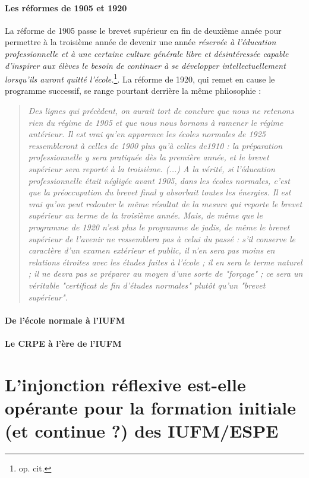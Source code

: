 \documentclass[a4paper,11pt]{article}
\begin{document}
			\subsection{Les réformes de 1905 et 1920}
			La réforme de 1905 passe le brevet supérieur en fin de deuxième année pour permettre à la troisième année de devenir une année \emph{réservée à l'éducation professionnelle et à une certaine culture générale libre et désintéressée capable d'inspirer aux élèves le besoin de continuer à se développer intellectuellement lorsqu'ils auront quitté l'école.}\footnote{op. cit.}. La réforme de 1920, qui remet en cause le programme successif, se range pourtant derrière la même philosophie : 
			\begin{quote}
			\emph{Des lignes qui précèdent, on aurait tort de conclure que nous ne retenons rien du régime de 1905 et que nous nous bornons à ramener le régime antérieur. Il est vrai qu'en apparence les écoles normales de 1925 ressembleront à celles de 1900 plus qu'à celles de1910 : la préparation professionnelle y sera pratiquée dès la première année, et le brevet supérieur sera reporté à la troisième. (...) A la vérité, si l'éducation professionnelle était négligée avant 1905, dans les écoles normales, c'est que la préoccupation du brevet final y absorbait toutes les énergies. Il est vrai qu'on peut redouter le même résultat de la mesure qui reporte le brevet supérieur au terme de la troisième année. Mais, de même que le programme de 1920 n'est plus le programme de jadis, de même le brevet supérieur de l'avenir ne ressemblera pas à celui du passé : s'il conserve le caractère d'un examen extérieur et public, il n'en sera pas moins en relations étroites avec les études faites à l'école ; il en sera le terme naturel ; il ne devra pas se préparer au moyen d'une sorte de "forçage" ; ce sera un véritable "certificat de fin d'études normales" plutôt qu'un "brevet supérieur".} 
			\end{quote}
			
			
			\subsection{De l'école normale à l'IUFM}
			
			
			\subsection{Le CRPE à l'ère de l'IUFM}
			
			


\part{L'injonction réflexive est-elle opérante pour la formation initiale (et continue ?) des IUFM/ESPE}
\end{document}
